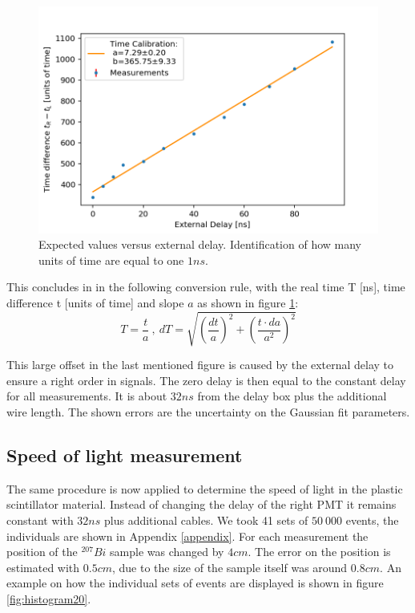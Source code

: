 \documentclass[]{article}
\begin{document}
\begin{figure}[H]
\centering
\includegraphics[width=1\textwidth]{Plots/TimeCalibration.png}
\caption{Expected values versus external delay. Identification of how many units of time are equal to one $1ns$. }
\label{fig:TimeCalibration}
\end{figure}

This concludes in in the following conversion rule, with the real time T [ns], time difference t [units of time] and slope $a$ as shown in figure \ref{fig:TimeCalibration}:
\begin{equation}
T = \frac{t}{a}\:,\: dT=\sqrt{\left(\frac{dt}{a}\right)^2 + \left(\frac{t\cdot da}{a^2}\right)^2}
\end{equation}

This large offset in the last mentioned figure is caused by the external delay to ensure a right order in signals. The zero delay is then equal to the constant delay for all measurements. It is about $32ns$ from the delay box plus the additional wire length. 
The shown errors are the uncertainty on the Gaussian fit parameters.


\subsection{Speed of light measurement}\label{c determination}
The same procedure is now applied to determine the speed of light in the plastic scintillator material. Instead of changing the delay of the right PMT it remains constant with $32ns$ plus additional cables. We took 41 sets of $50\ 000$ events, the individuals are shown in Appendix \ref{appendix}. For each measurement the position of the $^{207} Bi$ sample was changed by $4cm$. The error on the position is estimated with $0.5cm$, due to the size of the sample itself was around $0.8cm$. An example on how the individual sets of events are displayed is shown in figure \ref{fig:histogram20}.
\end{document}
